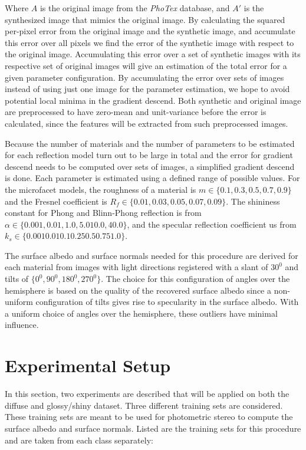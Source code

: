 Where $A$ is the original image from the {\it PhoTex} database, and $A'$ is the synthesized image that mimics the original image. By calculating the squared per-pixel error from the original image and the synthetic image, and accumulate this error over all pixels we find the error of the synthetic image with respect to the original image. Accumulating this error over a set of synthetic images with its respective set of original images will give an estimation of the total error for a given parameter configuration. By accumulating the error over sets of images instead of using just one image for the parameter estimation, we hope to avoid potential local minima in the gradient descend. Both synthetic and original image are preprocessed to have zero-mean and unit-variance before the error is calculated, since the features will be extracted from such preprocessed images.

Because the number of materials and the number of parameters to be estimated for each reflection model turn out to be large in total and the error for gradient descend needs to be computed over sets of images, a simplified gradient descend is done. Each parameter is estimated using a defined range of possible values. For the microfacet models, the roughness of a material is $m \in \{0.1, 0.3, 0.5, 0.7, 0.9\}$ and the Fresnel coefficient is $R_f \in \{0.01, 0.03, 0.05, 0.07, 0.09\}$. The shininess constant for Phong and Blinn-Phong reflection is from $\alpha \in \{0.001, 0.01, 1.0, 5.0 10.0, 40.0\}$, and the specular reflection coefficient us from $k_s \in \{0.001 0.01 0.1 0.25 0.5 0.75 1.0\}$. 

The surface albedo and surface normals needed for this procedure are derived for each material from images with light directions registered with a slant of $30^0$ and tilts of $\{0^0, 90^0, 180^0, 270^0\}$. The choice for this configuration of angles over the hemisphere is based on the quality of the recovered surface albedo since a non-uniform configuration of tilts gives rise to specularity in the surface albedo. With a uniform choice of angles over the hemisphere, these outliers have minimal influence.

\section{Experimental Setup}\label{sec:Experiments}
In this section, two experiments are described that will be applied on both the diffuse and glossy/shiny dataset. Three different training sets are considered. These training sets are meant to be used for photometric stereo to compute the surface albedo and surface normals. Listed are the training sets for this procedure and are taken from each class separately:

